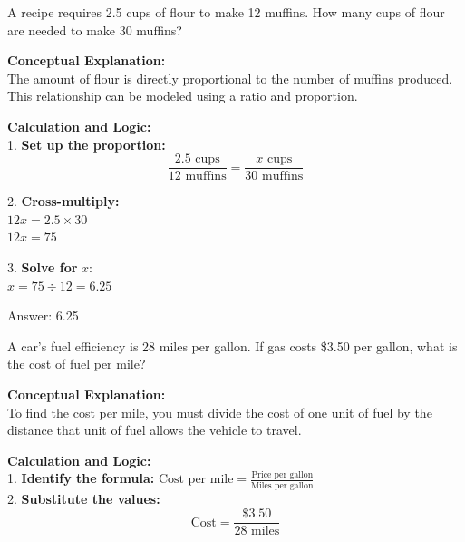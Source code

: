 \documentclass[11pt,paper=a4,answers]{exam}
\begin{document}
\begin{questions}

\question
A recipe requires 2.5 cups of flour to make 12 muffins. How many cups of flour are needed to make 30 muffins?

\begin{solution}
\textbf{Conceptual Explanation:} \\
The amount of flour is directly proportional to the number of muffins produced. This relationship can be modeled using a ratio and proportion.

\vspace{30pt}

\textbf{Calculation and Logic:} \\
1. \textbf{Set up the proportion:} \\
\[ \frac{2.5 \text{ cups}}{12 \text{ muffins}} = \frac{x \text{ cups}}{30 \text{ muffins}} \]

\vspace{15pt}

2. \textbf{Cross-multiply:} \\
$12x = 2.5 \times 30$ \\
$12x = 75$

\vspace{15pt}

3. \textbf{Solve for } $x$: \\
$x = 75 \div 12 = 6.25$

\vspace{30pt}

Answer: \colorbox{yellow!100}{6.25}
\end{solution}

\vspace{60pt}

\question
A car's fuel efficiency is 28 miles per gallon. If gas costs \$3.50 per gallon, what is the cost of fuel per mile?

\begin{solution}
\textbf{Conceptual Explanation:} \\
To find the cost per mile, you must divide the cost of one unit of fuel by the distance that unit of fuel allows the vehicle to travel.

\vspace{30pt}

\textbf{Calculation and Logic:} \\
1. \textbf{Identify the formula:} $\text{Cost per mile} = \frac{\text{Price per gallon}}{\text{Miles per gallon}}$ \\
2. \textbf{Substitute the values:} \\
\[ \text{Cost} = \frac{\$3.50}{28 \text{ miles}} \]


\end{solution}
\end{questions}
\end{document}
